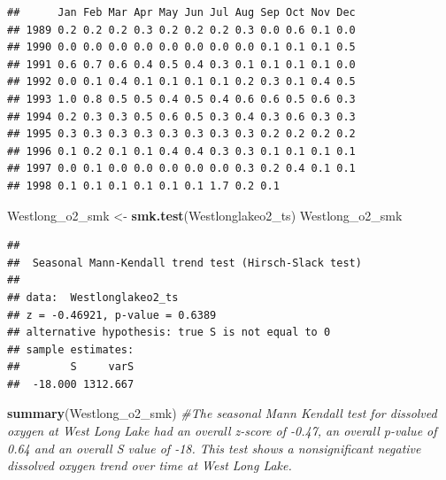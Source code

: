 \documentclass[12pt,]{article}
\newenvironment{Shaded}{\begin{snugshade}}{\end{snugshade}}
\newcommand{\KeywordTok}[1]{\textcolor[rgb]{0.13,0.29,0.53}{\textbf{#1}}}
\newcommand{\DataTypeTok}[1]{\textcolor[rgb]{0.13,0.29,0.53}{#1}}
\newcommand{\DecValTok}[1]{\textcolor[rgb]{0.00,0.00,0.81}{#1}}
\newcommand{\StringTok}[1]{\textcolor[rgb]{0.31,0.60,0.02}{#1}}
\newcommand{\CommentTok}[1]{\textcolor[rgb]{0.56,0.35,0.01}{\textit{#1}}}
\newcommand{\OperatorTok}[1]{\textcolor[rgb]{0.81,0.36,0.00}{\textbf{#1}}}
\newcommand{\NormalTok}[1]{#1}
\begin{document}
\begin{Shaded}
\end{Shaded}

\begin{verbatim}
##      Jan Feb Mar Apr May Jun Jul Aug Sep Oct Nov Dec
## 1989 0.2 0.2 0.2 0.3 0.2 0.2 0.2 0.3 0.0 0.6 0.1 0.0
## 1990 0.0 0.0 0.0 0.0 0.0 0.0 0.0 0.0 0.1 0.1 0.1 0.5
## 1991 0.6 0.7 0.6 0.4 0.5 0.4 0.3 0.1 0.1 0.1 0.1 0.0
## 1992 0.0 0.1 0.4 0.1 0.1 0.1 0.1 0.2 0.3 0.1 0.4 0.5
## 1993 1.0 0.8 0.5 0.5 0.4 0.5 0.4 0.6 0.6 0.5 0.6 0.3
## 1994 0.2 0.3 0.3 0.5 0.6 0.5 0.3 0.4 0.3 0.6 0.3 0.3
## 1995 0.3 0.3 0.3 0.3 0.3 0.3 0.3 0.3 0.2 0.2 0.2 0.2
## 1996 0.1 0.2 0.1 0.1 0.4 0.4 0.3 0.3 0.1 0.1 0.1 0.1
## 1997 0.0 0.1 0.0 0.0 0.0 0.0 0.0 0.3 0.2 0.4 0.1 0.1
## 1998 0.1 0.1 0.1 0.1 0.1 0.1 1.7 0.2 0.1
\end{verbatim}

\begin{Shaded}
\begin{Highlighting}[]
\NormalTok{Westlong_o2_smk <-}\StringTok{ }\KeywordTok{smk.test}\NormalTok{(Westlonglakeo2_ts)}
\NormalTok{Westlong_o2_smk}
\end{Highlighting}
\end{Shaded}

\begin{verbatim}
## 
##  Seasonal Mann-Kendall trend test (Hirsch-Slack test)
## 
## data:  Westlonglakeo2_ts
## z = -0.46921, p-value = 0.6389
## alternative hypothesis: true S is not equal to 0
## sample estimates:
##        S     varS 
##  -18.000 1312.667
\end{verbatim}

\begin{Shaded}
\begin{Highlighting}[]
\KeywordTok{summary}\NormalTok{(Westlong_o2_smk) }\CommentTok{#The seasonal Mann Kendall test for dissolved oxygen at West Long Lake had an overall z-score of -0.47, an overall p-value of 0.64 and an overall S value of -18. This test shows a nonsignificant negative dissolved oxygen trend over time at West Long Lake.}
\end{Highlighting}
\end{Shaded}
\end{document}
